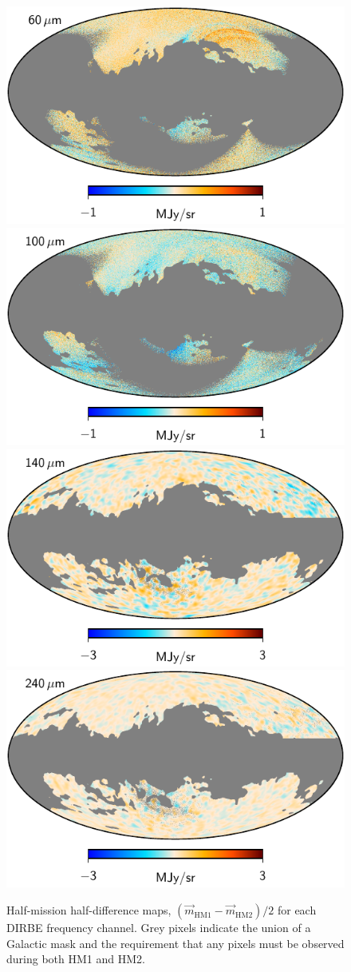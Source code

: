 \documentclass{aa}
\newcommand{\m}[0]{\vec{m}}
\begin{document}
\begin{figure}
  \includegraphics[width=0.40\linewidth]{figs/dirbe_07_hmhd_v1.pdf}\hspace*{5mm}
  \includegraphics[width=0.40\linewidth]{figs/dirbe_08_hmhd_v1.pdf}\\
  \includegraphics[width=0.40\linewidth]{figs/dirbe_09_hmhd_v1_3deg.pdf}\hspace*{5mm}
  \includegraphics[width=0.40\linewidth]{figs/dirbe_10_hmhd_v1_3deg.pdf}
  \caption{Half-mission half-difference maps, $(\m_{\mathrm{HM1}}-\m_{\mathrm{HM2}})/2$ for each DIRBE frequency channel. Grey pixels indicate the union of a Galactic mask and the requirement that any pixels must be observed during both HM1 and HM2. }
  \label{fig:hmhd}
\end{figure}
\end{document}
